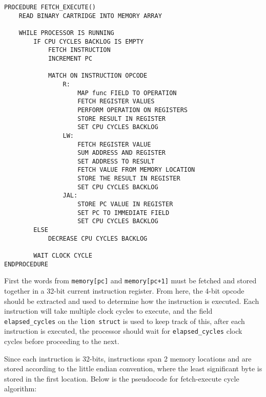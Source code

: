 \begin{lstlisting}
PROCEDURE FETCH_EXECUTE()
    READ BINARY CARTRIDGE INTO MEMORY ARRAY

    WHILE PROCESSOR IS RUNNING
        IF CPU CYCLES BACKLOG IS EMPTY
            FETCH INSTRUCTION 
            INCREMENT PC

            MATCH ON INSTRUCTION OPCODE 
                R: 
                    MAP func FIELD TO OPERATION 
                    FETCH REGISTER VALUES 
                    PERFORM OPERATION ON REGISTERS 
                    STORE RESULT IN REGISTER 
                    SET CPU CYCLES BACKLOG 
                LW:
                    FETCH REGISTER VALUE
                    SUM ADDRESS AND REGISTER
                    SET ADDRESS TO RESULT
                    FETCH VALUE FROM MEMORY LOCATION
                    STORE THE RESULT IN REGISTER
                    SET CPU CYCLES BACKLOG
                JAL:
                    STORE PC VALUE IN REGISTER
                    SET PC TO IMMEDIATE FIELD
                    SET CPU CYCLES BACKLOG
        ELSE 
            DECREASE CPU CYCLES BACKLOG

        WAIT CLOCK CYCLE
ENDPROCEDURE
\end{lstlisting}

First the words from \texttt{memory[pc]} and \texttt{memory[pc+1]} must be fetched and stored together in a 32-bit current instruction register. From here, the 4-bit opcode should be extracted and used to determine how the instruction is executed. Each instruction will take multiple clock cycles to execute, and the field \texttt{elapsed\_cycles} on the \texttt{lion struct} is used to keep track of this, after each instruction is executed, the processor should wait for \texttt{elapsed\_cycles} clock cycles before proceeding to the next. 

Since each instruction is 32-bits, instructions span 2 memory locations and are stored according to the little endian convention, where the least significant byte is stored in the first location. Below is the pseudocode for fetch-execute cycle algorithm: 

